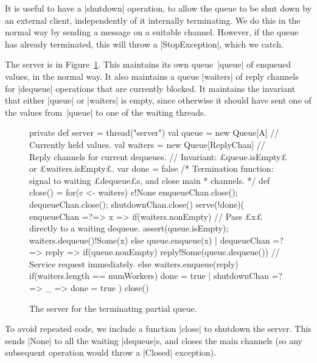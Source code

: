 
It is useful to have a |shutdown| operation, to allow the queue to be shut
down by an external client, independently of it internally terminating.  We do
this in the normal way by sending a message on a suitable channel.  However,
if the queue has already terminated, this will throw a |StopException|, which
we catch.

The server is in Figure~\ref{fig:terminating-queue-server}.  This maintains
its own queue~|queue| of enqueued values, in the normal way.  It also
maintains a queue |waiters| of reply channels for |dequeue| operations that
are currently blocked.  It maintains the invariant that either |queue| or
|waiters| is empty, since otherwise it should have sent one of the values
from~|queue| to one of the waiting threads.  


\begin{figure}
\begin{scala}
  private def server = thread("server"){
    val queue = new Queue[A] // Currently held values.
    val waiters = new Queue[ReplyChan] // Reply channels for current dequeues.
    // Invariant: £queue.isEmpty£ or £waiters.isEmpty£.
    var done = false
    /* Termination function: signal to waiting £dequeue£s, and close main
     * channels. */
    def close() = {
      for(c <- waiters) c!None
      enqueueChan.close(); dequeueChan.close(); shutdownChan.close()
    }
    serve(!done)(
      enqueueChan =?=> { x => 
        if(waiters.nonEmpty){ // Pass £x£ directly to a waiting dequeue.
          assert(queue.isEmpty); waiters.dequeue()!Some(x)
        }
        else queue.enqueue(x)
      }
      | dequeueChan =?=> { reply =>
          if(queue.nonEmpty)
            reply!Some(queue.dequeue()) // Service request immediately.
          else{
            waiters.enqueue(reply)
            if(waiters.length == numWorkers) done = true
          }
        }
      | shutdownChan =?=> { _ => done = true }
    )
    close()
  }
\end{scala}
\caption{The server for the terminating partial queue.}
\label{fig:terminating-queue-server}
\end{figure}


To avoid repeated code, we include a function |close| to shutdown the server.
This sends |None| to all the waiting |dequeue|s, and closes the main channels
(so any subsequent operation would throw a |Closed| exception).

